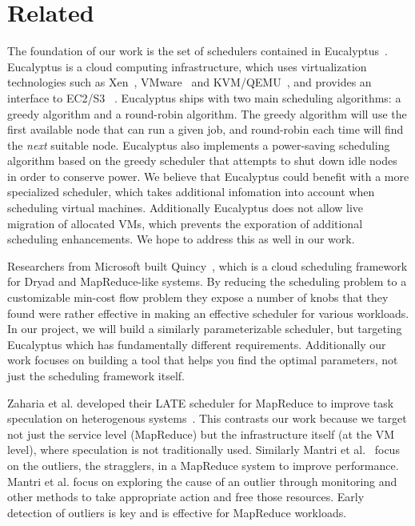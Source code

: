 \section{Related}



The foundation of our work is the set of schedulers contained in
Eucalyptus~\cite{Eucalyptus}.  Eucalyptus is a cloud computing infrastructure,
which uses virtualization technologies such as Xen~\cite{Xen},
VMware~\cite{VMware} and KVM/QEMU~\cite{QEMU}, and provides an interface to
EC2/S3 ~\cite{EC2,S3}.   Eucalyptus ships with two main scheduling algorithms: a
greedy algorithm and a round-robin algorithm.  The greedy algorithm will use the
first available node that can run a given job, and round-robin each time will
find the \emph{next} suitable node.
Eucalyptus also implements a power-saving scheduling algorithm based on the greedy scheduler that
attempts to shut down idle nodes  in order to conserve power.  We believe that
Eucalyptus could benefit with a more specialized scheduler, which takes
additional infomation into account when scheduling virtual machines.
Additionally Eucalyptus does not allow live migration of allocated VMs, which
prevents the exporation of additional scheduling enhancements.  We hope to
address this as well in our work.

Researchers from Microsoft built Quincy~\cite{Quincy}, which is a cloud
scheduling framework for Dryad and MapReduce-like systems.  By reducing the
scheduling problem to a customizable min-cost flow problem they expose a number
of knobs that they found were rather effective in making an effective scheduler
for various workloads.  In our project, we will build a similarly
parameterizable scheduler, but targeting Eucalyptus which has fundamentally
different requirements.  Additionally our work focuses on building a tool that
helps you find the optimal parameters, not just the scheduling framework itself.

Zaharia et al. developed their LATE scheduler for MapReduce to improve task
speculation on heterogenous systems~\cite{Zaharia}.  This contrasts our work
because we target not just the service level (MapReduce) but the infrastructure
itself (at the VM level), where speculation is not traditionally used.
Similarly Mantri et al.~\cite{Mantri} focus on the outliers, the stragglers, in
a MapReduce system to improve performance.  Mantri et al. focus on exploring the
cause of an outlier through monitoring and other methods to take appropriate
action and free those resources.  Early detection of outliers is key and is
effective for MapReduce workloads.

